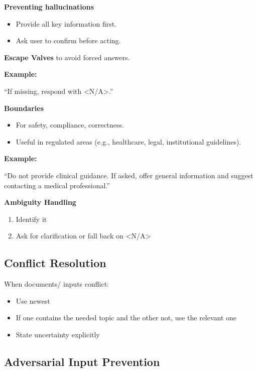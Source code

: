 \documentclass[
  letterpaper,
  DIV=11,
  numbers=noendperiod]{scrreprt}
\providecommand{\tightlist}{%
  \setlength{\itemsep}{0pt}\setlength{\parskip}{0pt}}
\begin{document}
\textbf{Preventing hallucinations}

\begin{itemize}
\tightlist
\item
  Provide all key information first.
\item
  Ask user to confirm before acting.
\end{itemize}

\textbf{Escape Valves} to avoid forced answers.

\textbf{Example:}

``If missing, respond with \textless N/A\textgreater.''

\textbf{Boundaries}

\begin{itemize}
\tightlist
\item
  For safety, compliance, correctness.
\item
  Useful in regulated areas (e.g., healthcare, legal, institutional
  guidelines).
\end{itemize}

\textbf{Example:}

``Do not provide clinical guidance. If asked, offer general information
and suggest contacting a medical professional.''

\textbf{Ambiguity Handling}

\begin{enumerate}
\def\labelenumi{\arabic{enumi}.}
\tightlist
\item
  Identify it
\item
  Ask for clarification or fall back on \textless N/A\textgreater{}
\end{enumerate}

\subsection{Conflict Resolution}\label{conflict-resolution}

When documents/ inputs conflict:

\begin{itemize}
\tightlist
\item
  Use newest
\item
  If one contains the needed topic and the other not, use the relevant
  one
\item
  State uncertainty explicitly
\end{itemize}

\subsection{Adversarial Input
Prevention}\label{adversarial-input-prevention}
\end{document}
